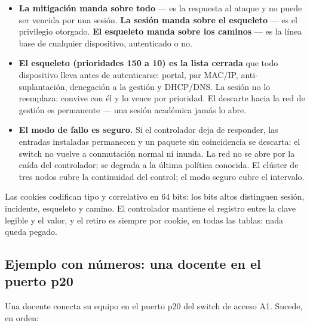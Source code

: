 \documentclass[11pt,a4paper]{article}
\begin{document}
\begin{itemize}
\item \textbf{La mitigación manda sobre todo} --- es la respuesta al ataque y no puede ser vencida por una sesión. \textbf{La sesión manda sobre el esqueleto} --- es el privilegio otorgado. \textbf{El esqueleto manda sobre los caminos} --- es la línea base de cualquier dispositivo, autenticado o no.
\item \textbf{El esqueleto (prioridades 150 a 10) es la lista cerrada} que todo dispositivo lleva antes de autenticarse: portal, par MAC/IP, anti-suplantación, denegación a la gestión y DHCP/DNS. La sesión no lo reemplaza: convive con él y lo vence por prioridad. El descarte hacia la red de gestión es permanente --- una sesión académica jamás lo abre.
\item \textbf{El modo de fallo es seguro.} Si el controlador deja de responder, las entradas instaladas permanecen y un paquete sin coincidencia se descarta: el switch no vuelve a conmutación normal ni inunda. La red no se abre por la caída del controlador; se degrada a la última política conocida. El clúster de tres nodos cubre la continuidad del control; el modo seguro cubre el intervalo.
\end{itemize}

Las cookies codifican tipo y correlativo en 64 bits: los bits altos distinguen sesión, incidente, esqueleto y camino. El controlador mantiene el registro entre la clave legible y el valor, y el retiro es siempre por cookie, en todas las tablas: nada queda pegado.

\subsection{Ejemplo con números: una docente en el puerto p20}
Una docente conecta su equipo en el puerto p20 del switch de acceso A1. Sucede, en orden:
\end{document}
